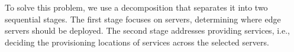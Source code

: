 \documentclass[10pt, conference, letterpaper]{IEEEtran}
\begin{document}
To solve this problem, we use a decomposition that separates it into two sequential stages. The first stage focuses on servers, determining where edge servers should be deployed. The second stage addresses providing services, i.e., deciding the provisioning locations of services across the selected servers. 
\end{document}
